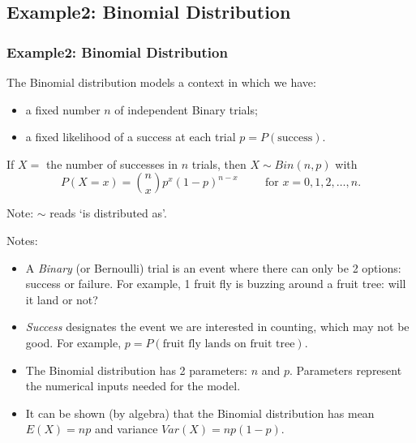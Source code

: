 \documentclass[t,xcolor=pdftex,dvipsnames,table]{beamer}
\begin{document}
\subsection{Example2: Binomial Distribution}
\begin{frame}\frametitle{Example2: Binomial Distribution}
\begin{definition}
The \alert{Binomial distribution} models a context in which we have:
\begin{itemize}
\item a fixed number $n$ of independent Binary trials; 
\item  a fixed likelihood of a success at each trial $p=P(\mbox{success})$. 
\end{itemize}

\vspace{.5cm}
If $X =$ the number of successes in $n$ trials, then  $X \sim Bin(n,p)$ with
\[ P(X=x) = {n \choose x} p^x (1-p)^{n-x} \hspace{1cm} \mbox{for } x=0,1,2,\ldots,n. \]
\end{definition}

\vspace{.5cm}
Note:  $\sim$ reads `is distributed as'.
\hyperlink{Factorials}{}
\hyperlink{BinomialCoefficients}{}
\end{frame}

\begin{frame}
Notes:
\begin{itemize}
\item A {\it Binary} (or Bernoulli) trial is an event where there can only be 2 options: success or failure. For example, 1 fruit fly is buzzing around a fruit tree: will it land or not?
\item {\it Success} designates the event we are interested in counting, which may not be good. For example,  $p=P(\mbox{fruit fly lands on fruit tree})$.
\item The Binomial distribution has 2 parameters: $n$ and $p$. Parameters represent the numerical inputs needed for the model.
\item It can be shown (by algebra) that the Binomial distribution has mean $E(X)=np$ and variance $Var(X)=np(1-p)$.
\end{itemize}
\end{frame}
\end{document}
